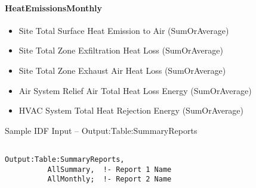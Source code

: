 \paragraph{HeatEmissionsMonthly}\label{HeatEmissionsMonthly}

\begin{itemize}
\item
  Site Total Surface Heat Emission to Air (SumOrAverage)
\item
  Site Total Zone Exfiltration Heat Loss (SumOrAverage)
\item
  Site Total Zone Exhaust Air Heat Loss (SumOrAverage)
\item
  Air System Relief Air Total Heat Loss Energy (SumOrAverage)
\item
  HVAC System Total Heat Rejection Energy (SumOrAverage)
\end{itemize}

Sample IDF Input -- Output:Table:SummaryReports

\begin{lstlisting}

Output:Table:SummaryReports,
          AllSummary,  !- Report 1 Name
          AllMonthly;  !- Report 2 Name
\end{lstlisting}
